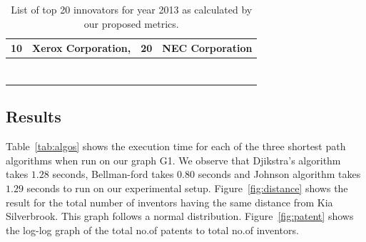 \begin{table}[t]
\begin{tabular}{clcl}
\multicolumn{1}{|c|}{10}            & \multicolumn{1}{l|}{Xerox Corporation,}                          & \multicolumn{1}{c|}{20}            & \multicolumn{1}{l|}{NEC Corporation}                           \\ \hline
\multicolumn{1}{l}{}                &                                                                  & \multicolumn{1}{l}{}               &                                                                \\
\multicolumn{1}{l}{}                &                                                                  & \multicolumn{1}{l}{}               &                                                                \\
\multicolumn{1}{l}{}                &                                                                  & \multicolumn{1}{l}{}               &                                                                \\
\multicolumn{1}{l}{}                &                                                                  & \multicolumn{1}{l}{}               &                                                                \\
\multicolumn{1}{l}{}                &                                                                  & \multicolumn{1}{l}{}               &                                                                \\
\multicolumn{1}{l}{}                &                                                                  & \multicolumn{1}{l}{}               &                                                                \\
\multicolumn{1}{l}{}                &                                                                  & \multicolumn{1}{l}{}               &                                                               
\end{tabular}
\caption{List of top 20 innovators for year 2013 as calculated by our proposed metrics.}
\label{lst:top20}
\end{table}

\subsection{Results}
Table~\ref{tab:algos} shows the execution time for each of the three shortest
path algorithms  when run on our graph G1. We observe that Djikstra's
algorithm takes $1.28$ seconds, Bellman-ford takes $0.80$ seconds and Johnson
algorithm takes $1.29$ seconds to run on our experimental setup.
Figure~\ref{fig:distance} shows the result for the total number of inventors
having the same distance from Kia Silverbrook. This graph follows a normal
distribution. Figure~\ref{fig:patent} shows the log-log graph of the total
no.of patents to total no.of inventors. 



